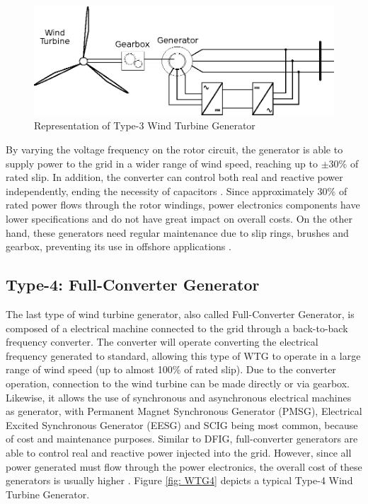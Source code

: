 \begin{figure}[h]
	\caption{Representation of Type-3 Wind Turbine Generator}
	\begin{center}
		\includegraphics[scale=1]{Images/Type3WTG.eps}
	\end{center}
	\label{fig: WTG3}
\end{figure}

By varying the voltage frequency on the rotor circuit, the generator is able to supply power to the grid in a wider range of wind speed, reaching up to $\pm 30\%$ of rated slip. In addition, the converter can control both real and reactive power independently, ending the necessity of capacitors \cite{Muljadi2010}. Since approximately 30\% of rated power flows through the rotor windings, power electronics components have lower specifications and do not have great impact on overall costs. On the other hand, these generators need regular maintenance due to slip rings, brushes and gearbox, preventing its use in offshore applications \cite{Yaramasu2015}.

\subsection{Type-4: Full-Converter Generator}

The last type of wind turbine generator, also called Full-Converter Generator, is composed of a electrical machine connected to the grid through a back-to-back frequency converter. The converter will operate converting the electrical frequency generated to standard, allowing this type of WTG to operate in a large range of wind speed (up to almost 100\% of rated slip). Due to the converter operation, connection to the wind turbine can be made directly or via gearbox. Likewise, it allows the use of synchronous and asynchronous electrical machines as generator, with Permanent Magnet Synchronous Generator (PMSG), Electrical Excited Synchronous Generator (EESG) and SCIG being most common, because of cost and maintenance purposes. Similar to DFIG, full-converter generators are able to control real and reactive power injected into the grid. However, since all power generated must flow through the power electronics, the overall cost of these generators is usually higher \cite{Yaramasu2015}. Figure \ref{fig: WTG4} depicts a typical Type-4 Wind Turbine Generator.

